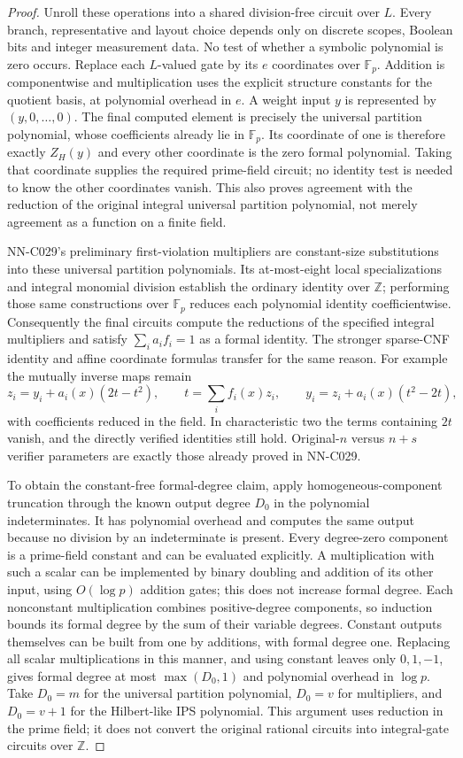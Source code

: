 \begin{proof}
Unroll these operations into a shared division-free circuit over $L$. Every branch, representative and layout choice depends only on discrete scopes, Boolean bits and integer measurement data. No test of whether a symbolic polynomial is zero occurs. Replace each $L$-valued gate by its $e$ coordinates over $\mathbb F_p$. Addition is componentwise and multiplication uses the explicit structure constants for the quotient basis, at polynomial overhead in $e$. A weight input $y$ is represented by $(y,0,\ldots,0)$. The final computed element is precisely the universal partition polynomial, whose coefficients already lie in $\mathbb F_p$. Its coordinate of one is therefore exactly $Z_H(y)$ and every other coordinate is the zero formal polynomial. Taking that coordinate supplies the required prime-field circuit; no identity test is needed to know the other coordinates vanish. This also proves agreement with the reduction of the original integral universal partition polynomial, not merely agreement as a function on a finite field.

NN-C029's preliminary first-violation multipliers are constant-size substitutions into these universal partition polynomials. Its at-most-eight local specializations and integral monomial division establish the ordinary identity over $\mathbb Z$; performing those same constructions over $\mathbb F_p$ reduces each polynomial identity coefficientwise. Consequently the final circuits compute the reductions of the specified integral multipliers and satisfy $\sum_i a_if_i=1$ as a formal identity. The stronger sparse-CNF identity and affine coordinate formulas transfer for the same reason. For example the mutually inverse maps remain
\[
 z_i=y_i+a_i(x)(2t-t^2),\qquad
 t=\sum_i f_i(x)z_i,\qquad
 y_i=z_i+a_i(x)(t^2-2t),
\]
with coefficients reduced in the field. In characteristic two the terms containing $2t$ vanish, and the directly verified identities still hold. Original-$n$ versus $n+s$ verifier parameters are exactly those already proved in NN-C029.

To obtain the constant-free formal-degree claim, apply homogeneous-component truncation through the known output degree $D_0$ in the polynomial indeterminates. It has polynomial overhead and computes the same output because no division by an indeterminate is present. Every degree-zero component is a prime-field constant and can be evaluated explicitly. A multiplication with such a scalar can be implemented by binary doubling and addition of its other input, using $O(\log p)$ addition gates; this does not increase formal degree. Each nonconstant multiplication combines positive-degree components, so induction bounds its formal degree by the sum of their variable degrees. Constant outputs themselves can be built from one by additions, with formal degree one. Replacing all scalar multiplications in this manner, and using constant leaves only $0,1,-1$, gives formal degree at most $\max(D_0,1)$ and polynomial overhead in $\log p$. Take $D_0=m$ for the universal partition polynomial, $D_0=v$ for multipliers, and $D_0=v+1$ for the Hilbert-like IPS polynomial. This argument uses reduction in the prime field; it does not convert the original rational circuits into integral-gate circuits over $\mathbb Z$.
\end{proof}
